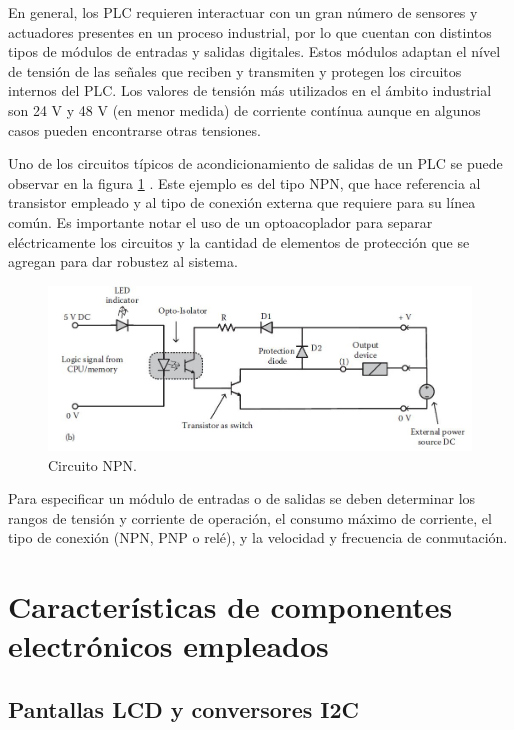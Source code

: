 En general, los PLC requieren interactuar con un gran número de sensores y actuadores presentes en un proceso industrial, por lo que cuentan con distintos tipos de módulos de entradas y salidas digitales. Estos módulos adaptan el nível de tensión de las señales que reciben y transmiten y protegen los circuitos internos del PLC\citep{Introduction_Industrial_Automation}. Los valores de tensión más utilizados en el ámbito industrial son 24 V y 48 V (en menor medida) de corriente contínua aunque en algunos casos pueden encontrarse otras tensiones.

Uno de los circuitos típicos de acondicionamiento de salidas de un PLC se puede observar en la figura \ref{fig:Circuito_NPN} \citep{Introduction_Industrial_Automation}. Este ejemplo es del tipo NPN, que hace referencia al transistor empleado y al tipo de conexión externa que requiere para su línea común. Es importante notar el uso de un optoacoplador para separar eléctricamente los circuitos y la cantidad de elementos de protección que se agregan para dar robustez al sistema.

\begin{figure}[htbp]
	\centering
	\includegraphics[scale=.5]{./Figures/Circuito_NPN.JPG}
	\caption{Circuito NPN.}
	\label{fig:Circuito_NPN}
\end{figure}

Para especificar un módulo de entradas o de salidas se deben determinar los rangos de tensión y corriente de operación, el consumo máximo de corriente, el tipo de conexión (NPN, PNP o relé), y la velocidad y frecuencia de conmutación.

\section{Características de componentes electrónicos empleados}

\subsection{Pantallas LCD y conversores I2C}
\label{seccion_display_led}

